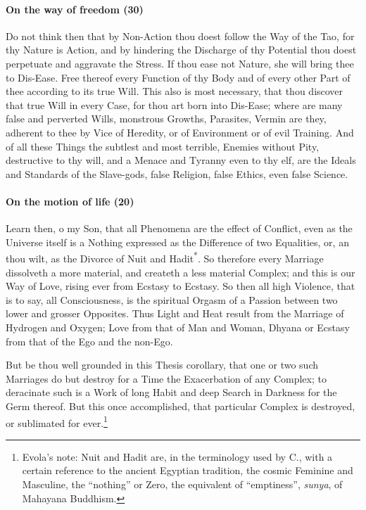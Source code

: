 \paragraph{On the way of freedom (30)}


Do not think then that by Non-Action thou doest follow the Way of the Tao, for thy Nature is Action, and by hindering the Discharge of thy Potential thou doest perpetuate and aggravate the Stress. If thou ease not Nature, she will bring thee to Dis-Ease. Free thereof every Function of thy Body and of every other Part of thee according to its true Will. This also is most necessary, that thou discover that true Will in every Case, for thou art born into Dis-Ease; where are many false and perverted Wills, monstrous Growths, Parasites, Vermin are they, adherent to thee by Vice of Heredity, or of Environment or of evil Training. And of all these Things the subtlest and most terrible, Enemies without Pity, destructive to thy will, and a Menace and Tyranny even to thy elf, are the Ideals and Standards of the Slave-gods, false Religion, false Ethics, even false Science.

\paragraph{On the motion of life (20)}


Learn then, o my Son, that all Phenomena are the effect of Conflict, even as the Universe itself is a Nothing expressed as the Difference of two Equalities, or, an thou wilt, as the Divorce of Nuit and Hadit\textsuperscript{*}. So therefore every Marriage dissolveth a more material, and createth a less material Complex; and this is our Way of Love, rising ever from Ecstasy to Ecstasy. So then all high Violence, that is to say, all Consciousness, is the spiritual Orgasm of a Passion between two lower and grosser Opposites. Thus Light and Heat result from the Marriage of Hydrogen and Oxygen; Love from that of Man and Woman, Dhyana or Ecstasy from that of the Ego and the non-Ego.

But be thou well grounded in this Thesis corollary, that one or two such Marriages do but destroy for a Time the Exacerbation of any Complex; to deracinate such is a Work of long Habit and deep Search in Darkness for the Germ thereof. But this once accomplished, that particular Complex is destroyed, or sublimated for ever.\footnote{Evola's note: Nuit and Hadit are, in the terminology used by C., with a certain reference to the ancient Egyptian tradition, the cosmic Feminine and Masculine, the ``nothing'' or Zero, the equivalent of ``emptiness'', \emph{sunya}, of Mahayana Buddhism.}

